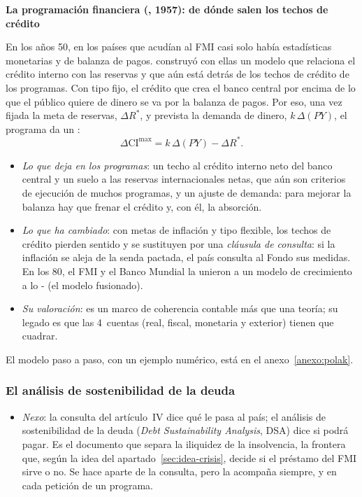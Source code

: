\documentclass[11pt]{article}
\begin{document}
\begin{anotaciones}
\textbf{La programación financiera (, 1957): de dónde salen los techos de crédito}

En los años 50, en los países que acudían al FMI casi solo había estadísticas monetarias y de balanza de pagos. \textcite{Polak1957} construyó con ellas un modelo que relaciona el crédito interno con las reservas y que aún está detrás de los techos de crédito de los programas\nocite{Polak1998}. Con tipo fijo, el crédito que crea el banco central por encima de lo que el público quiere de dinero se va por la balanza de pagos. Por eso, una vez fijada la meta de reservas, $\Delta R^*$, y prevista la demanda de dinero, $k\,\Delta(PY)$, el programa da un :
\[
\Delta\mathrm{CI}^{\max}=k\,\Delta(PY)-\Delta R^* .
\]
\begin{itemize}
\item \emph{Lo que deja en los programas}: un techo al crédito interno neto del banco central y un suelo a las reservas internacionales netas, que aún son criterios de ejecución de muchos programas, y un ajuste de demanda: para mejorar la balanza hay que frenar el crédito y, con él, la absorción.
\item \emph{Lo que ha cambiado}: con metas de inflación y tipo flexible, los techos de crédito pierden sentido y se sustituyen por una \emph{cláusula de consulta}: si la inflación se aleja de la senda pactada, el país consulta al Fondo sus medidas. En los 80, el FMI y el Banco Mundial la unieron a un modelo de crecimiento a lo - (el modelo fusionado)\nocite{KhanMontielHaque1990}.
\item \emph{Su valoración}: es un marco de coherencia contable más que una teoría; su legado es que las 4~cuentas (real, fiscal, monetaria y exterior) tienen que cuadrar.
\end{itemize}
El modelo paso a paso, con un ejemplo numérico, está en el anexo~\ref{anexo:polak}.
\end{anotaciones}

\subsubsection{El análisis de sostenibilidad de la deuda}\label{sec:dsa}

\begin{itemize}
\item \emph{Nexo}: la consulta del artículo~IV dice qué le pasa al país; el análisis de sostenibilidad de la deuda (\emph{Debt Sustainability Analysis}, DSA) dice si podrá pagar. Es el documento que separa la iliquidez de la insolvencia, la frontera que, según la idea del apartado~\ref{sec:idea-crisis}, decide si el préstamo del FMI sirve o no. Se hace aparte de la consulta, pero la acompaña siempre, y en cada petición de un programa.
\end{itemize}
\end{document}

